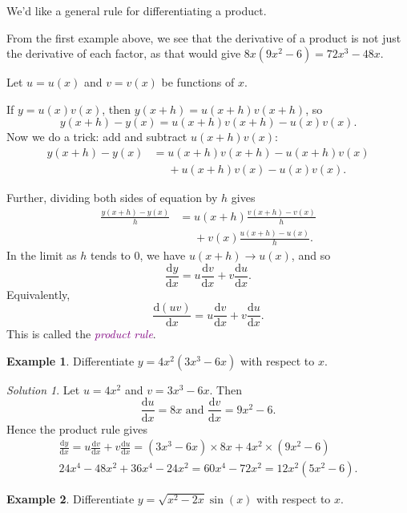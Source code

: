 \documentclass[
  english,
  11pt,
  oneside]{book}
\newcommand{\slide}{}
\theoremstyle{definition}
\theoremstyle{definition}
\newtheorem{example}{Example}[chapter]
\theoremstyle{definition}
\theoremstyle{definition}
\theoremstyle{remark}
\newtheorem*{solution}{Solution}
\begin{document}
We'd like a general rule for differentiating a product.

From the first example above, we see that the derivative of a product is not just the derivative of each factor, as
that would give \(8x(9x^2 - 6) = 72x^3 - 48x\).

Let \(u = u(x)\) and \(v = v(x)\) be functions of \(x\).

If \(y = u(x)v(x)\), then \(y(x+h) = u(x+h)v(x+h)\), so
\[y(x+h)-y(x) = u(x+h)v(x+h) - u(x)v(x).\]
Now we do a trick: add and subtract \(u(x+h)v(x)\):
\begin{align*}
y(x+h)-y(x) &= u(x+h)v(x+h) - u(x+h)v(x)\\
    &\phantom{=} + u(x+h)v(x) - u(x)v(x).
\end{align*}
\slide
Further, dividing both sides of equation by \(h\) gives
\begin{align*}
\frac{y(x+h)-y(x)}{h} &= u(x+h)\frac{v(x+h) - v(x)}{h} \\
 &\phantom{=} + v(x)\frac{u(x+h ) - u(x)}{h}.
\end{align*}
In the limit as \(h\) tends to \(0\), we have \(u(x+h)\to u(x)\), and so
\[\frac{\mathrm{d} y}{\mathrm{d} x} = u\frac{\mathrm{d} v}{\mathrm{d} x} + v\frac{\mathrm{d} u}{\mathrm{d} x}.\]
Equivalently,
\[\frac{\mathrm{d}(uv)}{\mathrm{d} x} = u\frac{\mathrm{d} v}{\mathrm{d} x} + v\frac{\mathrm{d} u}{\mathrm{d} x}.\]
This is called the \textcolor{purple}{\em product rule}.
\slide

\begin{example}
Differentiate \(y=4x^2(3x^3-6x)\) with respect to \(x\).
\end{example}

\begin{solution}
Let \(u = 4x^2\) and \(v = 3x^3-6x\). Then
\[\frac{\mathrm{d} u}{\mathrm{d} x} = 8x\text{ and }\frac{\mathrm{d} v}{\mathrm{d} x} = 9x^2-6.\]
Hence the product rule gives
\begin{gather*}
\frac{\mathrm{d} y}{\mathrm{d} x} = u\frac{\mathrm{d} v}{\mathrm{d} x} + v\frac{\mathrm{d} u}{\mathrm{d} x} = (3x^3-6x)\times 8x + 4x^2\times(9x^2-6)\\
24x^4 - 48x^2 + 36x^4-24x^2 = 60x^4-72x^2 = 12x^2(5x^2-6).
\end{gather*}
\end{solution}

\slide

\begin{example}
Differentiate \(y=\sqrt{x^2-2x}\sin(x)\) with respect to \(x\).
\end{example}
\end{document}
